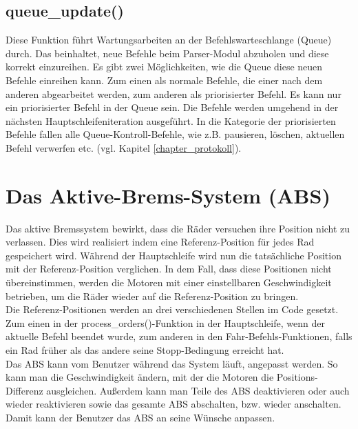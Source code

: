 \subsection{queue\_update()\label{chapter_queue_update}}
Diese Funktion führt Wartungsarbeiten an der Befehlswarteschlange (Queue) durch. Das beinhaltet, neue
Befehle beim Parser-Modul abzuholen und diese korrekt einzureihen. Es gibt zwei Möglichkeiten, wie die Queue
diese neuen Befehle einreihen kann. Zum einen als normale Befehle, die einer nach dem anderen abgearbeitet werden,
zum anderen als priorisierter Befehl. Es kann nur ein priorisierter Befehl in der Queue sein. Die Befehle werden
umgehend in der nächsten Haupt\-schleifen\-iteration ausgeführt. In die Kategorie der priorisierten Befehle fallen
alle Queue-Kontroll-Befehle, wie z.B. pausieren, löschen, aktuellen Befehl verwerfen etc. (vgl. Kapitel \ref{chapter_protokoll}).

\section{Das Aktive-Brems-System (ABS)\label{chapter_abs}}
Das aktive Bremssystem bewirkt, dass die Räder versuchen ihre Position nicht zu verlassen. Dies wird realisiert indem
eine Referenz-Position für jedes Rad gespeichert wird. Während der Hauptschleife wird nun die tatsächliche Position mit
der Referenz-Position verglichen. In dem Fall, dass diese Positionen nicht übereinstimmen, werden die Motoren mit einer
einstellbaren Geschwindigkeit betrieben, um die Räder wieder auf die Referenz-Position zu bringen.\\
Die Referenz-Positionen werden an drei verschiedenen Stellen im Code gesetzt. Zum einen in der process\_\-orders()-Funktion
in der Hauptschleife, wenn der aktuelle Befehl beendet wurde, zum anderen in den Fahr-Befehls-Funktionen, falls ein Rad
früher als das andere seine Stopp-Bedingung erreicht hat.\\
Das ABS kann vom Benutzer während das System läuft, angepasst werden. So kann man die Geschwindigkeit ändern, mit der
die Motoren die Positions-Differenz ausgleichen. Außerdem kann man Teile des ABS deaktivieren oder auch wieder reaktivieren
sowie das gesamte ABS abschalten, bzw. wieder anschalten. Damit kann der Benutzer das ABS an seine Wünsche anpassen.

